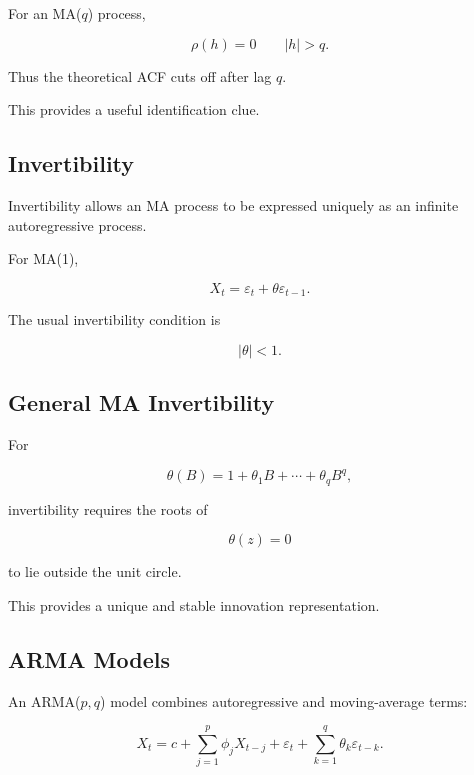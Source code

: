 For an MA(\(q\)) process,

\[
\boxed{
\rho(h)=0
\qquad
|h|>q.
}
\]

Thus the theoretical ACF cuts off after lag \(q\).

This provides a useful identification clue.

\subsection{Invertibility}
\label{subsec:ma-invertibility}

Invertibility allows an MA process to be expressed uniquely as an
infinite autoregressive process.

For MA(1),

\[
\boxed{
X_t
=
\varepsilon_t
+
\theta\varepsilon_{t-1}.
}
\]

The usual invertibility condition is

\[
\boxed{
|\theta|<1.
}
\]

\subsection{General MA Invertibility}
\label{subsec:general-ma-invertibility}

For

\[
\theta(B)
=
1
+
\theta_1B
+
\cdots
+
\theta_qB^q,
\]

invertibility requires the roots of

\[
\boxed{
\theta(z)=0
}
\]

to lie outside the unit circle.

This provides a unique and stable innovation representation.

\subsection{ARMA Models}
\label{subsec:arma-models}

An ARMA(\(p,q\)) model combines autoregressive and moving-average terms:

\[
\boxed{
X_t
=
c
+
\sum_{j=1}^{p}
\phi_jX_{t-j}
+
\varepsilon_t
+
\sum_{k=1}^{q}
\theta_k\varepsilon_{t-k}.
}
\]


